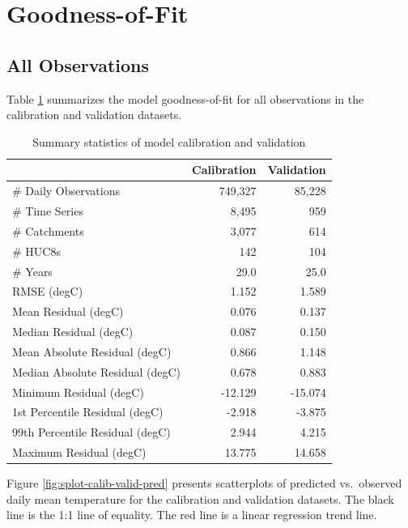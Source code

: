 \documentclass[]{book}
\begin{document}
\hypertarget{goodness-of-fit}{%
\section{Goodness-of-Fit}\label{goodness-of-fit}}

\hypertarget{all-observations}{%
\subsection{All Observations}\label{all-observations}}

Table \ref{tab:table-gof} summarizes the model goodness-of-fit for all observations in the calibration and validation datasets.

\begin{table}

\caption{\label{tab:table-gof}Summary statistics of model calibration and validation}
\centering
\begin{tabular}[t]{l|r|r}
\hline
 & Calibration & Validation\\
\hline
\# Daily Observations & 749,327 & 85,228\\
\hline
\# Time Series & 8,495 & 959\\
\hline
\# Catchments & 3,077 & 614\\
\hline
\# HUC8s & 142 & 104\\
\hline
\# Years & 29.0 & 25.0\\
\hline
RMSE (degC) & 1.152 & 1.589\\
\hline
Mean Residual (degC) & 0.076 & 0.137\\
\hline
Median Residual (degC) & 0.087 & 0.150\\
\hline
Mean Absolute Residual (degC) & 0.866 & 1.148\\
\hline
Median Absolute Residual (degC) & 0.678 & 0.883\\
\hline
Minimum Residual (degC) & -12.129 & -15.074\\
\hline
1st Percentile Residual (degC) & -2.918 & -3.875\\
\hline
99th Percentile Residual (degC) & 2.944 & 4.215\\
\hline
Maximum Residual (degC) & 13.775 & 14.658\\
\hline
\end{tabular}
\end{table}

Figure \ref{fig:splot-calib-valid-pred} presents scatterplots of predicted vs.~observed daily mean temperature for the calibration and validation datasets. The black line is the 1:1 line of equality. The red line is a linear regression trend line.
\end{document}
